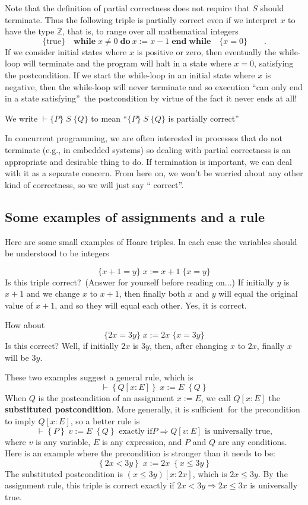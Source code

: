 \documentclass[11pt]{article}%
\begin{document}
Note that the definition of partial correctness does not require that $S$
should terminate. Thus the following triple is partially correct even if we
interpret $x$ to have the type $\mathbb{Z}$, that is, to range over all
mathematical integers%
\[
\{\mathrm{true}\}\quad\mathbf{while}\;x\neq0\;\mathbf{do}%
\ x:=x-1\;\mathbf{end\;while}\quad\{x=0\}\qquad\text{.}%
\]
If we consider initial states where $x$ is positive or zero, then eventually
the while-loop will terminate and the program will halt in a state where
$x=0$, satisfying the postcondition. If we start the while-loop in an initial
state where $x$ is negative, then the while-loop will never terminate and so
execution \textquotedblleft can only end in a state
satisfying\textquotedblright\ the postcondition by virtue of the fact it never
ends at all!

We write $\vdash\{P\}\;S\;\{Q\}$ to mean \textquotedblleft$\{P\}\;S\;\{Q\}$ is
partially correct\textquotedblright

In concurrent programming, we are often interested in processes that do not
terminate (e.g., in embedded systems) so dealing with partial correctness is
an appropriate and desirable thing to do. If termination is important, we can
deal with it as a separate concern. From here on, we won't be worried about
any other kind of correctness, so we will just say \textquotedblleft
correct\textquotedblright.

\subsection{Some examples of assignments and a rule}

Here are some small examples of Hoare triples. In each case the variables
should be understood to be integers%

\[
\{x+1=y\}\;x:=x+1\;\{x=y\}
\]
Is this triple correct?\ (Answer for yourself before reading on...) If
initially $y$ is $x+1$ and we change $x$ to $x+1$, then finally both $x$ and
$y$ will equal the original value of $x+1$, and so they will equal each other.
Yes, it is correct.

How about%
\[
\{2x=3y\}\;x:=2x\;\{x=3y\}
\]
Is this correct? Well, if initially $2x$ is $3y$, then, after changing $x$ to
$2x$, finally $x$ will be $3y$.

These two examples suggest a general rule, which is%
\[
\vdash\left\{  Q[x:E]\right\}  \;x:=E\;\left\{  Q\right\}
\]
When $Q$ is the postcondition of an assignment $x:=E$, we call $Q[x:E]$ the
\textbf{substituted postcondition}. More generally, it is sufficient\ for the
precondition to imply $Q[x:E]$, so a better rule is%
\[
\vdash\left\{  P\right\}  \;v:=E\;\left\{  Q\right\}  \text{ exactly if
}P\Rightarrow Q[v:E]\text{ is universally true,}%
\]
where $v$ is any variable, $E$ is any expression, and $P$ and $Q$ are any
conditions. Here is an example where the precondition is stronger than it
needs to be:%
\[
\left\{  2x<3y\right\}  \;x:=2x\;\left\{  x\leq3y\right\}
\]
The substituted postcondition is $(x\leq3y)[x:2x]$, which is $2x\leq3y$. By
the assignment rule, this triple is correct exactly if $2x<3y\Rightarrow
2x\leq3x$ is universally true.
\end{document}
